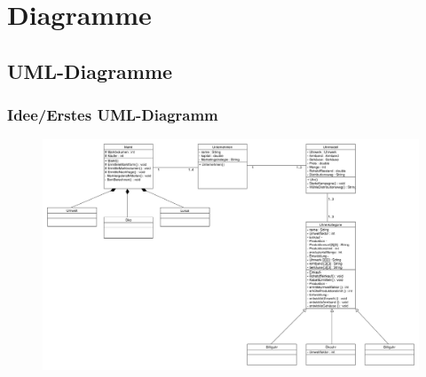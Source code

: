 \clearpage
\chapter{Diagramme}
\section{UML-Diagramme}
\subsection{Idee/Erstes UML-Diagramm}
\begin{figure} [h]
	\centering
	\includegraphics[scale=0.25, angle=90]{img/ErsterEntwurfUML.png} 
\end{figure}
\clearpage
